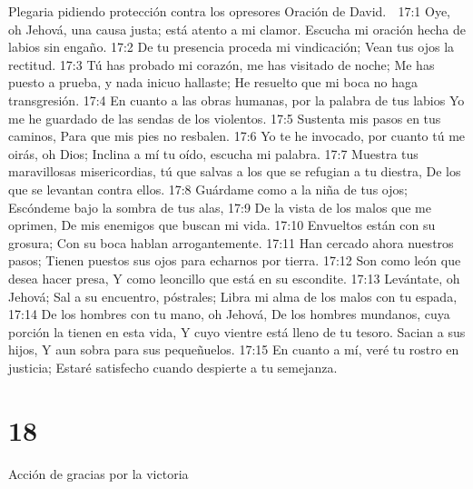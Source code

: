 Plegaria pidiendo protección contra los opresores 
Oración de David. 

17:1 Oye, oh Jehová, una causa justa; está atento a mi clamor. 
Escucha mi oración hecha de labios sin engaño. 
17:2 De tu presencia proceda mi vindicación; 
Vean tus ojos la rectitud. 
17:3 Tú has probado mi corazón, me has visitado de noche; 
Me has puesto a prueba, y nada inicuo hallaste; 
He resuelto que mi boca no haga transgresión. 
17:4 En cuanto a las obras humanas, por la palabra de tus labios 
Yo me he guardado de las sendas de los violentos. 
17:5 Sustenta mis pasos en tus caminos, 
Para que mis pies no resbalen. 
17:6 Yo te he invocado, por cuanto tú me oirás, oh Dios; 
Inclina a mí tu oído, escucha mi palabra. 
17:7 Muestra tus maravillosas misericordias, tú que salvas a los que se refugian a tu diestra, 
De los que se levantan contra ellos. 
17:8 Guárdame como a la niña de tus ojos; 
Escóndeme bajo la sombra de tus alas, 
17:9 De la vista de los malos que me oprimen, 
De mis enemigos que buscan mi vida. 
17:10 Envueltos están con su grosura; 
Con su boca hablan arrogantemente. 
17:11 Han cercado ahora nuestros pasos; 
Tienen puestos sus ojos para echarnos por tierra. 
17:12 Son como león que desea hacer presa, 
Y como leoncillo que está en su escondite. 
17:13 Levántate, oh Jehová; 
Sal a su encuentro, póstrales; 
Libra mi alma de los malos con tu espada, 
17:14 De los hombres con tu mano, oh Jehová, 
De los hombres mundanos, cuya porción la tienen en esta vida, 
Y cuyo vientre está lleno de tu tesoro. 
Sacian a sus hijos, 
Y aun sobra para sus pequeñuelos. 
17:15 En cuanto a mí, veré tu rostro en justicia; 
Estaré satisfecho cuando despierte a tu semejanza. 

\chapter{18}

Acción de gracias por la victoria 
 
